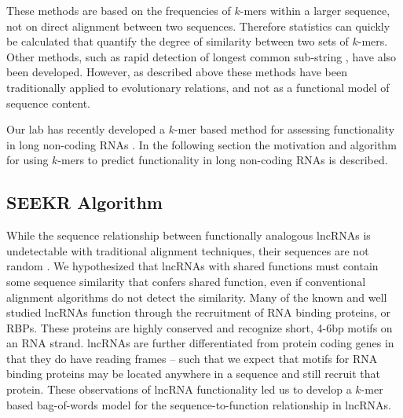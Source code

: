 These methods are based on the frequencies of $k$-mers within a larger sequence, not on direct alignment between two sequences. Therefore statistics can quickly be calculated that quantify the degree of similarity between two sets of $k$-mers. Other methods, such as rapid detection of longest common sub-string \cite{Ulitsky2006TheReconstruction}, have also been developed. However, as described above these methods have been traditionally applied to evolutionary relations, and not as a functional model of sequence content. 

Our lab has recently developed a $k$-mer based method for assessing functionality in long non-coding RNAs \cite{Kirk2018FunctionalContent}. In the following section the motivation and algorithm for using $k$-mers to predict functionality in long non-coding RNAs is described. 

\subsection{SEEKR Algorithm}

 While the sequence relationship between functionally analogous lncRNAs is undetectable with traditional alignment techniques, their sequences are not random \cite{Brown10TheNucleus.,Brockdorff2018LocalNcRNA,Kirk2018FunctionalContent,Sprague2019NonlinearDomains,Wang2017TargetingGuanines,Zhao2008PolycombChromosome,Pintacuda2017HnRNPKSilencing}. We hypothesized that lncRNAs with shared functions must contain some sequence similarity that confers shared function, even if conventional alignment algorithms do not detect the similarity. Many of the known and well studied lncRNAs function through the recruitment of RNA binding proteins, or RBPs. These proteins are highly conserved and recognize short, 4-6bp motifs on an RNA strand. lncRNAs are further differentiated from protein coding genes in that they do have reading frames -- such that we expect that motifs for RNA binding proteins may be located anywhere in a sequence and still recruit that protein. These observations of lncRNA functionality led us to develop a $k$-mer based bag-of-words model for the sequence-to-function relationship in lncRNAs.
 
